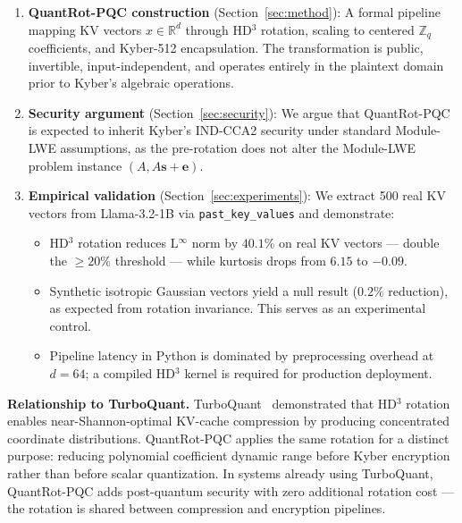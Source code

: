 \documentclass[preprint,a4paper]{article}
\begin{document}
\begin{enumerate}

    \item \textbf{QuantRot-PQC construction}
    (Section~\ref{sec:method}): A formal pipeline
    mapping KV vectors $x \in \mathbb{R}^d$ through
    HD$^3$ rotation, scaling to centered $\mathbb{Z}_q$
    coefficients, and Kyber-512 encapsulation.
    The transformation is public, invertible,
    input-independent, and operates entirely in the
    plaintext domain prior to Kyber's algebraic
    operations.

    \item \textbf{Security argument}
    (Section~\ref{sec:security}): We argue that
    QuantRot-PQC is expected to inherit Kyber's
    IND-CCA2 security under standard Module-LWE
    assumptions, as the pre-rotation does not alter
    the Module-LWE problem instance
    $(A, A\mathbf{s}+\mathbf{e})$.

    \item \textbf{Empirical validation}
    (Section~\ref{sec:experiments}): We extract
    500 real KV vectors from Llama-3.2-1B via
    \texttt{past\_key\_values} and demonstrate:
    \begin{itemize}
        \item HD$^3$ rotation reduces L$^\infty$
        norm by $\mathbf{40.1\%}$ on real KV
        vectors --- double the $\geq 20\%$
        threshold --- while kurtosis drops from
        $6.15$ to $-0.09$.
        \item Synthetic isotropic Gaussian vectors
        yield a null result ($0.2\%$ reduction),
        as expected from rotation invariance.
        This serves as an experimental control.
        \item Pipeline latency in Python is
        dominated by preprocessing overhead at
        $d = 64$; a compiled HD$^3$ kernel is
        required for production deployment.
    \end{itemize}

\end{enumerate}

\textbf{Relationship to TurboQuant.}
TurboQuant~\cite{turboquant2025} demonstrated
that HD$^3$ rotation enables near-Shannon-optimal
KV-cache compression by producing concentrated
coordinate distributions. QuantRot-PQC applies
the same rotation for a distinct purpose:
reducing polynomial coefficient dynamic range
before Kyber encryption rather than before
scalar quantization. In systems already using
TurboQuant, QuantRot-PQC adds post-quantum
security with zero additional rotation cost ---
the rotation is shared between compression and
encryption pipelines.
\end{document}
